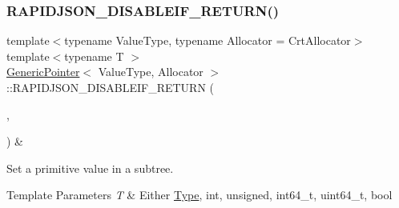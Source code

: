 \subsubsection{\texorpdfstring{R\+A\+P\+I\+D\+J\+S\+O\+N\+\_\+\+D\+I\+S\+A\+B\+L\+E\+I\+F\+\_\+\+R\+E\+T\+U\+R\+N()}{RAPIDJSON\_DISABLEIF\_RETURN()}\hspace{0.1cm}{\footnotesize\ttfamily [2/3]}}
{\footnotesize\ttfamily template$<$typename Value\+Type, typename Allocator = Crt\+Allocator$>$ \\
template$<$typename T $>$ \\
\hyperlink{a02232}{Generic\+Pointer}$<$ Value\+Type, Allocator $>$\+::R\+A\+P\+I\+D\+J\+S\+O\+N\+\_\+\+D\+I\+S\+A\+B\+L\+E\+I\+F\+\_\+\+R\+E\+T\+U\+RN (\begin{DoxyParamCaption}\item[{(internal\+::\+Or\+Expr$<$ internal\+::\+Is\+Pointer$<$ T $>$, \hyperlink{a02020}{internal\+::\+Is\+Generic\+Value}$<$ T $>$ $>$)}]{,  }\item[{(Value\+Type \&)}]{ }\end{DoxyParamCaption}) \&}



Set a primitive value in a subtree. 


\begin{DoxyTemplParams}{Template Parameters}
{\em T} & Either \hyperlink{a00560_a1d1cfd8ffb84e947f82999c682b666a7}{Type}, {\ttfamily int}, {\ttfamily unsigned}, {\ttfamily int64\+\_\+t}, {\ttfamily uint64\+\_\+t}, {\ttfamily bool} \\
\hline
\end{DoxyTemplParams}
\mbox{\label{a02232_a1bb4a253f33687734e5b20795632a801}} 
